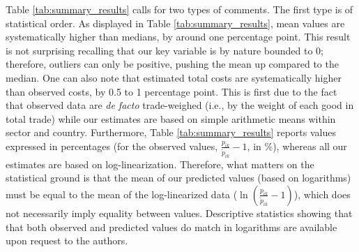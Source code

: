 \documentclass[a4paper,11pt]{article}
\begin{document}
Table \ref{tab:summary_results} calls for two types of comments. The first type is of statistical order. As displayed in Table \ref{tab:summary_results}, mean values are systematically higher than medians, by around one percentage point. This result is not surprising recalling that our key variable is by nature bounded to 0; therefore, outliers can only be positive, pushing the mean up compared to the median. One can also note that estimated total costs are systematically higher than observed costs, by 0.5 to 1 percentage point. This is first due to the fact that observed data are \textit{de facto} trade-weighed (i.e., by the weight of each good in total trade) while our estimates are based on simple arithmetic means within sector and country. Furthermore, Table \ref{tab:summary_results} reports values expressed in percentages (for the observed values, $\frac{p_{ik}}{\widetilde{p}_{ik}} -1$, in \%), whereas all our estimates are based on log-linearization. Therefore, what matters on the statistical ground is that the mean of our predicted values (based on logarithms) must be equal to the mean of the log-linearized data ($\ln\left(\frac{p_{ik}}{\widetilde{p}_{ik}}-1 \right)$), which does not necessarily imply equality between values. Descriptive statistics showing that that both observed and predicted values do match in logarithms are available upon request to the authors.\medskip
\end{document}
